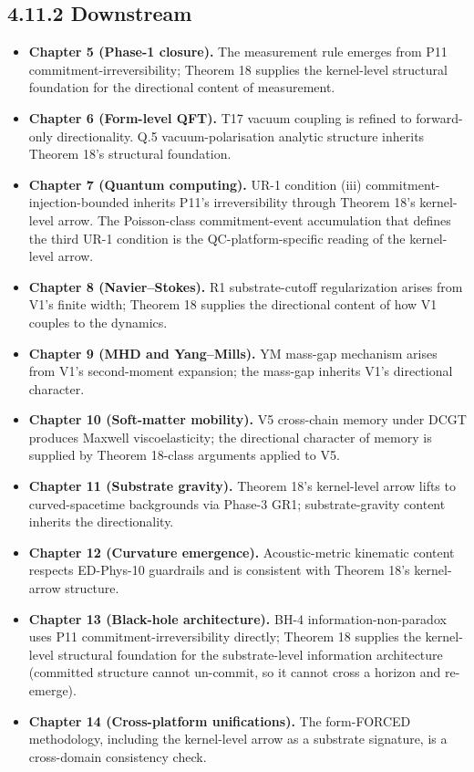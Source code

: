 \documentclass[11pt]{book}
\begin{document}
\subsection{4.11.2 Downstream}

\begin{itemize}
\item \textbf{Chapter 5 (Phase-1 closure).} The measurement rule emerges from P11 commitment-irreversibility; Theorem 18 supplies the kernel-level structural foundation for the directional content of measurement.
\item \textbf{Chapter 6 (Form-level QFT).} T17 vacuum coupling is refined to forward-only directionality. Q.5 vacuum-polarisation analytic structure inherits Theorem 18's structural foundation.
\item \textbf{Chapter 7 (Quantum computing).} UR-1 condition (iii) commitment-injection-bounded inherits P11's irreversibility through Theorem 18's kernel-level arrow. The Poisson-class commitment-event accumulation that defines the third UR-1 condition is the QC-platform-specific reading of the kernel-level arrow.
\item \textbf{Chapter 8 (Navier–Stokes).} R1 substrate-cutoff regularization arises from V1's finite width; Theorem 18 supplies the directional content of how V1 couples to the dynamics.
\item \textbf{Chapter 9 (MHD and Yang–Mills).} YM mass-gap mechanism arises from V1's second-moment expansion; the mass-gap inherits V1's directional character.
\item \textbf{Chapter 10 (Soft-matter mobility).} V5 cross-chain memory under DCGT produces Maxwell viscoelasticity; the directional character of memory is supplied by Theorem 18-class arguments applied to V5.
\item \textbf{Chapter 11 (Substrate gravity).} Theorem 18's kernel-level arrow lifts to curved-spacetime backgrounds via Phase-3 GR1; substrate-gravity content inherits the directionality.
\item \textbf{Chapter 12 (Curvature emergence).} Acoustic-metric kinematic content respects ED-Phys-10 guardrails and is consistent with Theorem 18's kernel-arrow structure.
\item \textbf{Chapter 13 (Black-hole architecture).} BH-4 information-non-paradox uses P11 commitment-irreversibility directly; Theorem 18 supplies the kernel-level structural foundation for the substrate-level information architecture (committed structure cannot un-commit, so it cannot cross a horizon and re-emerge).
\item \textbf{Chapter 14 (Cross-platform unifications).} The form-FORCED methodology, including the kernel-level arrow as a substrate signature, is a cross-domain consistency check.
\end{itemize}
\end{document}
